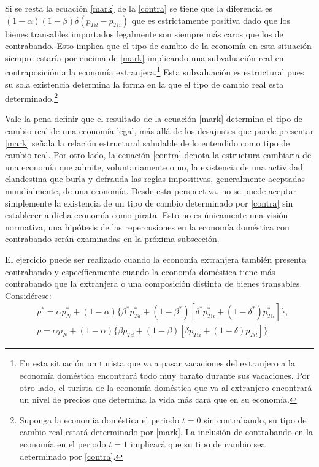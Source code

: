 \documentclass[12pt,letterpaper]{article}
\begin{document}
Si se resta la ecuación \ref{mark} de la \ref{contra} se tiene que la diferencia es $(1-\alpha)(1-\beta)\delta (p_{Til}-p_{Tii})$ que es estrictamente positiva dado que los bienes transables importados legalmente son siempre más caros que los de contrabando. Esto implica que el tipo de cambio de la economía en esta situación siempre estaría por encima de \ref{mark} implicando una subvaluación real en contraposición a la economía extranjera.\footnote{En esta situación un turista que va a pasar vacaciones del extranjero a la economía doméstica encontrará todo muy barato durante sus vacaciones. Por otro lado, el turista de la economía doméstica que va al extranjero encontrará un nivel de precios que determina la vida más cara que en su economía.}  Esta subvaluación es estructural pues su sola existencia determina la forma en la que el tipo de cambio real esta determinado.\footnote{Suponga la economía doméstica el periodo $t=0$ sin contrabando, su tipo de cambio real estará determinado por \ref{mark}. La inclusión de contrabando en la economía en el periodo $t=1$ implicará que su tipo de cambio sea determinado por \ref{contra}.}

Vale la pena definir que el resultado de la ecuación \ref{mark} determina el tipo de cambio real de una economía legal, más allá de los desajustes que puede presentar \ref{mark} señala la relación estructural saludable de lo entendido como tipo de cambio real. Por otro lado, la ecuación \ref{contra} denota la estructura cambiaria de una economía que admite, voluntariamente o no, la existencia de una actividad clandestina que burla y defrauda las reglas impositivas, generalmente aceptadas mundialmente, de una economía. Desde esta perspectiva, no se puede aceptar simplemente la existencia de un tipo de cambio determinado por \ref{contra} sin establecer a dicha economía como pirata. Esto no es únicamente una visión normativa, una hipótesis de las repercusiones en la economía doméstica con contrabando serán examinadas en la próxima subsección.

El ejercicio puede ser realizado cuando la economía extranjera también presenta contrabando y específicamente cuando la economía doméstica tiene más contrabando que la extranjera o una composición distinta de bienes transables. Considérese:
\begin{align}
&p^*=\alpha p_N^*+(1-\alpha)\{\beta^* p_{Td}^*+(1-\beta^*)[\delta^* p_{Tii}^* + (1-\delta^*)p_{Til}^*]\},\\
&p=\alpha p_N+(1-\alpha)\{\beta p_{Td}+(1-\beta)[\delta p_{Tii} + (1-\delta)p_{Til}]\}.
\end{align}
\end{document}
